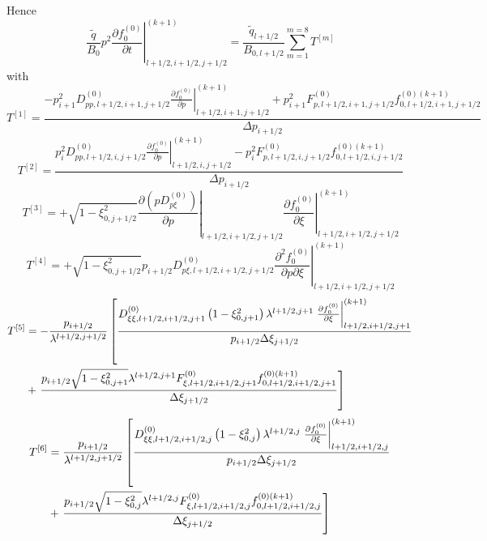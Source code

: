 Hence 
\begin{equation}
\left. \frac{\widetilde{q}}{B_{0}}p^{2}\frac{\partial f_{0}^{\left( 0\right)
}}{\partial t}\right| _{l+1/2,i+1/2,j+1/2}^{(k+1)}=\frac{\widetilde{q}
_{l+1/2}}{B_{0,l+1/2}}\sum_{m=1}^{m=8}T^{\left[ m\right] }
\end{equation}
with 
\begin{equation}
T^{\left[ 1\right] }=\frac{-p_{i+1}^{2}D_{pp,l+1/2,i+1,j+1/2}^{\left(
0\right) }\left. \frac{\partial f_{0}^{\left( 0\right) }}{\partial p}\right|
_{l+1/2,i+1,j+1/2}^{(k+1)}+p_{i+1}^{2}F_{p,l+1/2,i+1,j+1/2}^{\left( 0\right)
}f_{0,l+1/2,i+1,j+1/2}^{\left( 0\right) (k+1)}}{\Delta p_{i+1/2}}
\end{equation}
\begin{equation}
T^{\left[ 2\right] }=\frac{p_{i}^{2}D_{pp,l+1/2,i,j+1/2}^{\left( 0\right)
}\left. \frac{\partial f_{0}^{\left( 0\right) }}{\partial p}\right|
_{l+1/2,i,j+1/2}^{(k+1)}-p_{i}^{2}F_{p,l+1/2,i,j+1/2}^{\left( 0\right)
}f_{0,l+1/2,i,j+1/2}^{\left( 0\right) (k+1)}}{\Delta p_{i+1/2}}
\end{equation}
\begin{equation}
T^{\left[ 3\right] }=+\sqrt{1-\xi _{0,j+1/2}^{2}}\left. \frac{\partial
\left( pD_{p\xi }^{\left( 0\right) }\right) }{\partial p}\right|
_{l+1/2,i+1/2,j+1/2}\left. \frac{\partial f_{0}^{\left( 0\right) }}{\partial
\xi }\right| _{l+1/2,i+1/2,j+1/2}^{(k+1)}
\end{equation}
\begin{equation}
T^{\left[ 4\right] }=+\sqrt{1-\xi _{0,j+1/2}^{2}}p_{i+1/2}D_{p\xi
,l+1/2,i+1/2,j+1/2}^{\left( 0\right) }\left. \frac{\partial
^{2}f_{0}^{\left( 0\right) }}{\partial p\partial \xi }\right|
_{l+1/2,i+1/2,j+1/2}^{(k+1)}
\end{equation}
\begin{align}
T^{\left[ 5\right] }& =-\frac{p_{i+1/2}}{\lambda ^{l+1/2,j+1/2}}\left[ \frac{%
D_{\xi \xi ,l+1/2,i+1/2,j+1}^{\left( 0\right) }\left( 1-\xi
_{0,j+1}^{2}\right) \lambda ^{l+1/2,j+1}\left. \frac{\partial f_{0}^{\left(
0\right) }}{\partial \xi }\right| _{l+1/2,i+1/2,j+1}^{(k+1)}}{%
p_{i+1/2}\Delta \xi _{j+1/2}}\right.  \notag \\
& +\left. \frac{p_{i+1/2}\sqrt{1-\xi _{0,j+1}^{2}}\lambda ^{l+1/2,j+1}F_{\xi
,l+1/2,i+1/2,j+1}^{\left( 0\right) }f_{0,l+1/2,i+1/2,j+1}^{\left( 0\right)
(k+1)}}{\Delta \xi _{j+1/2}}\right]
\end{align}
\begin{align}
T^{\left[ 6\right] }& =\frac{p_{i+1/2}}{\lambda ^{l+1/2,j+1/2}}\left[ \frac{
D_{\xi \xi ,l+1/2,i+1/2,j}^{\left( 0\right) }\left( 1-\xi _{0,j}^{2}\right)
\lambda ^{l+1/2,j}\left. \frac{\partial f_{0}^{\left( 0\right) }}{\partial
\xi }\right| _{l+1/2,i+1/2,j}^{(k+1)}}{p_{i+1/2}\Delta \xi _{j+1/2}}\right. 
\notag \\
& +\left. \frac{p_{i+1/2}\sqrt{1-\xi _{0,j}^{2}}\lambda ^{l+1/2,j}F_{\xi
,l+1/2,i+1/2,j}^{\left( 0\right) }f_{0,l+1/2,i+1/2,j}^{\left( 0\right) (k+1)}%
}{\Delta \xi _{j+1/2}}\right]
\end{align}

